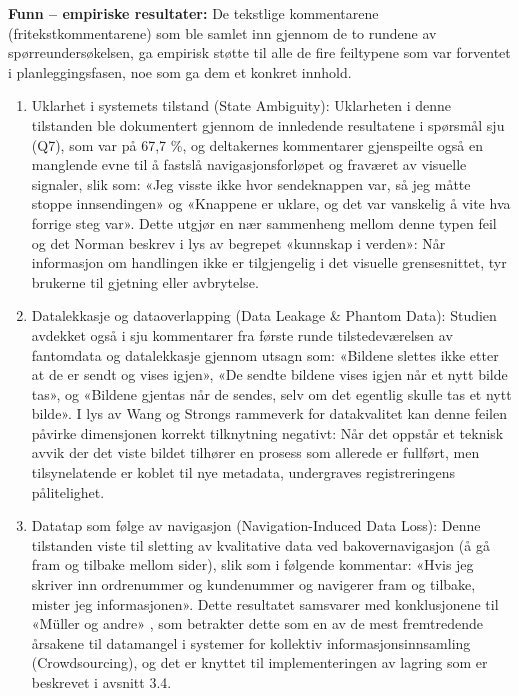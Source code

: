 \textbf{Funn – empiriske resultater: } De tekstlige kommentarene (fritekstkommentarene) som ble samlet inn gjennom de to rundene av spørreundersøkelsen, ga empirisk støtte til alle de fire feiltypene som var forventet i planleggingsfasen, noe som ga dem et konkret innhold.
\begin{enumerate}
    \item Uklarhet i systemets tilstand (State Ambiguity): Uklarheten i denne tilstanden ble dokumentert gjennom de innledende resultatene i spørsmål sju (Q7), som var på 67,7 \%, og deltakernes kommentarer gjenspeilte også en manglende evne til å fastslå navigasjonsforløpet og fraværet av visuelle signaler, slik som: «Jeg visste ikke hvor sendeknappen var, så jeg måtte stoppe innsendingen» og «Knappene er uklare, og det var vanskelig å vite hva forrige steg var». Dette utgjør en nær sammenheng mellom denne typen feil og det Norman \cite{norman2013} beskrev i lys av begrepet «kunnskap i verden»: Når informasjon om handlingen ikke er tilgjengelig i det visuelle grensesnittet, tyr brukerne til gjetning eller avbrytelse.

    \item Datalekkasje og dataoverlapping (Data Leakage \& Phantom Data): Studien avdekket også i sju kommentarer fra første runde tilstedeværelsen av fantomdata og datalekkasje gjennom utsagn som: «Bildene slettes ikke etter at de er sendt og vises igjen», «De sendte bildene vises igjen når et nytt bilde tas», og «Bildene gjentas når de sendes, selv om det egentlig skulle tas et nytt bilde». I lys av Wang og Strongs rammeverk for datakvalitet \cite{wang1996} kan denne feilen påvirke dimensjonen korrekt tilknytning negativt: Når det oppstår et teknisk avvik der det viste bildet tilhører en prosess som allerede er fullført, men tilsynelatende er koblet til nye metadata, undergraves registreringens pålitelighet.

    \item Datatap som følge av navigasjon (Navigation-Induced Data Loss): Denne tilstanden viste til sletting av kvalitative data ved bakovernavigasjon (å gå fram og tilbake mellom sider), slik som i følgende kommentar: «Hvis jeg skriver inn ordrenummer og kundenummer og navigerer fram og tilbake, mister jeg informasjonen». Dette resultatet samsvarer med konklusjonene til «Müller og andre» \cite{muller2024}, som betrakter dette som en av de mest fremtredende årsakene til datamangel i systemer for kollektiv informasjonsinnsamling (Crowdsourcing), og det er knyttet til implementeringen av lagring som er beskrevet i avsnitt 3.4.


\end{enumerate}
